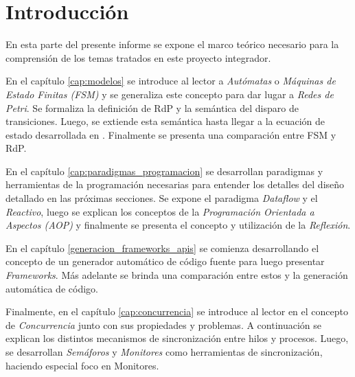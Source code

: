 \section*{Introducción}

En esta parte del presente informe se expone el marco teórico necesario para
la comprensión de los temas tratados en este proyecto integrador.

En el capítulo \ref{cap:modelos} se introduce al lector a \textit{Autómatas} o
\textit{Máquinas de Estado Finitas (FSM)} y se generaliza este concepto para dar
lugar a \textit{Redes de Petri}. Se formaliza la definición de RdP y la
semántica del disparo de transiciones. Luego, se extiende esta semántica hasta
llegar a la ecuación de estado desarrollada en \cite{Ecuacion_generalizada_LAC}.
Finalmente se presenta una comparación entre FSM y RdP.

En el capítulo \ref{cap:paradigmas_programacion} se desarrollan paradigmas y
herramientas de la programación necesarias para entender los detalles del diseño
detallado en las próximas secciones. Se expone el paradigma \textit{Dataflow} y
el \textit{Reactivo}, luego se explican los conceptos de la \textit{Programación
Orientada a Aspectos (AOP)} y finalmente se presenta el concepto y utilización
de la \textit{Reflexión}.

En el capítulo \ref{generacion_frameworks_apis} se comienza desarrollando el
concepto de un generador automático de código fuente para luego presentar
\textit{Frameworks}. Más adelante se brinda una comparación entre estos y la
generación automática de código.

Finalmente, en el capítulo \ref{cap:concurrencia} se introduce al lector en el
concepto de \textit{Concurrencia} junto con sus propiedades y problemas. A
continuación se explican los distintos mecanismos de sincronización entre hilos
y procesos. Luego, se desarrollan \textit{Semáforos} y \textit{Monitores} como
herramientas de sincronización, haciendo especial foco en Monitores.

